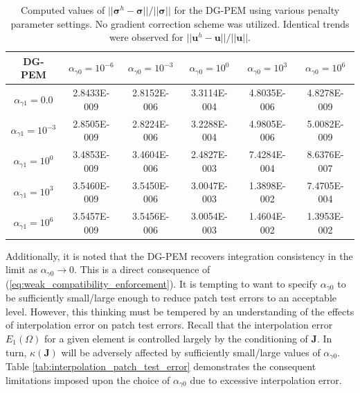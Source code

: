 \begin{table}[!ht]
  \begin{center}
    \begin{tabular}{| c || c | c | c | c | c |}
    \hline
    DG-PEM & $\alpha_{\gamma0} = 10^{-6}$ & $\alpha_{\gamma0} = 10^{-3}$ & $\alpha_{\gamma0} = 10^{0}$ & $\alpha_{\gamma0} = 10^{3}$ & $\alpha_{\gamma0} = 10^{6}$ \\ \hline \hline
    	$\alpha_{\gamma1} = 0.0$ & 2.8433E-009 & 2.8152E-006 & 3.3114E-004 & 4.8035E-006 & 4.8278E-009 \\ \hline
    $\alpha_{\gamma1} = 10^{-3}$ & 2.8505E-009 & 2.8224E-006 & 3.2288E-004 & 4.9805E-006 & 5.0082E-009 \\ \hline
    $\alpha_{\gamma1} = 10^{0}$ & 3.4853E-009 & 3.4604E-006 & 2.4827E-003 &  7.4284E-004 & 8.6376E-007 \\ \hline
    $\alpha_{\gamma1} = 10^{3}$ & 3.5460E-009 & 3.5450E-006 & 3.0047E-003 & 1.3898E-002 & 7.4705E-004 \\ \hline
    $\alpha_{\gamma1} = 10^{6}$ & 3.5457E-009 & 3.5456E-006 & 3.0054E-003 & 1.4604E-002 & 1.3953E-002 \\
    \hline
    \end{tabular}
    \caption{Computed values of $||\boldsymbol{\sigma}^h - \boldsymbol{\sigma}|| / ||\boldsymbol{\sigma}||$ for the DG-PEM using various penalty parameter settings. No gradient correction scheme was utilized. Identical trends were observed for $||\mathbf{u}^h - \mathbf{u}|| / ||\mathbf{u}||$.}
    \vspace{-5pt}
    \label{tab:linear_patch_test_parameter_study}
    \vspace{-25pt}
  \end{center}
\end{table}

Additionally, it is noted that the DG-PEM recovers integration consistency in the limit as $\alpha_{\gamma0} \rightarrow 0$. This is a direct consequence of (\ref{eq:weak_compatibility_enforcement}). It is tempting to want to specify $\alpha_{\gamma0}$ to be sufficiently small/large enough to reduce patch test errors to an acceptable level. However, this thinking must be tempered by an understanding of the effects of interpolation error on patch test errors. Recall that the interpolation error $E_1 (\Omega)$ for a given element is controlled largely by the conditioning of $\mathbf{J}$. In turn, $\kappa (\mathbf{J})$ will be adversely affected by sufficiently small/large values of $\alpha_{\gamma0}$. Table \ref{tab:interpolation_patch_test_error} demonstrates the consequent limitations imposed upon the choice of $\alpha_{\gamma0}$ due to excessive interpolation error.


